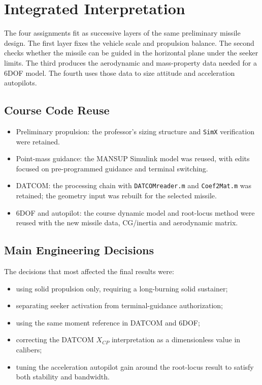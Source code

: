 \section{Integrated Interpretation}

The four assignments fit as successive layers of the same preliminary missile design. The first layer fixes the vehicle scale and propulsion balance. The second checks whether the missile can be guided in the horizontal plane under the seeker limits. The third produces the aerodynamic and mass-property data needed for a 6DOF model. The fourth uses those data to size attitude and acceleration autopilots.

\subsection{Course Code Reuse}

\begin{itemize}
    \item Preliminary propulsion: the professor's sizing structure and \texttt{SimX} verification were retained.
    \item Point-mass guidance: the MANSUP Simulink model was reused, with edits focused on pre-programmed guidance and terminal switching.
    \item DATCOM: the processing chain with \texttt{DATCOMreader.m} and \texttt{Coef2Mat.m} was retained; the geometry input was rebuilt for the selected missile.
    \item 6DOF and autopilot: the course dynamic model and root-locus method were reused with the new missile data, CG/inertia and aerodynamic matrix.
\end{itemize}

\subsection{Main Engineering Decisions}

The decisions that most affected the final results were:

\begin{itemize}
    \item using solid propulsion only, requiring a long-burning solid sustainer;
    \item separating seeker activation from terminal-guidance authorization;
    \item using the same moment reference in DATCOM and 6DOF;
    \item correcting the DATCOM \(X_{CP}\) interpretation as a dimensionless value in calibers;
    \item tuning the acceleration autopilot gain around the root-locus result to satisfy both stability and bandwidth.
\end{itemize}

